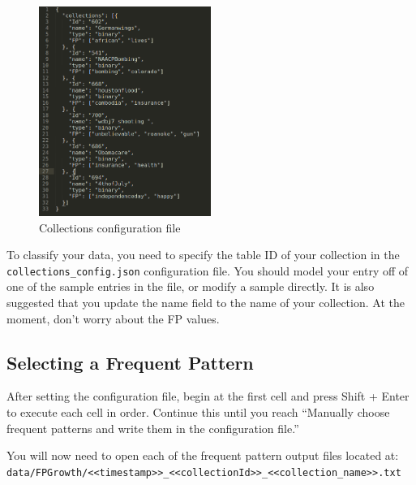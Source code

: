 \begin{figure}[th!]
	\centering
	\includegraphics[width=0.5\textwidth]{figures/collection_config}
    \caption{Collections configuration file}\label{fig:collection_config}
\end{figure}


To classify your data, you need to specify the table ID of your collection in the \texttt{collections\_config.json} configuration file. You should model your entry off of one of the sample entries in the file, or modify a sample directly. It is also suggested that you update the name field to the name of your collection. At the moment, don't worry about the FP values.

\subsection{Selecting a Frequent Pattern}

After setting the configuration file, begin at the first cell and press Shift + Enter to execute each cell in order. Continue this until you reach ``Manually choose frequent patterns and write them in the configuration file.''

You will now need to open each of the frequent pattern output files located at:\\
\texttt{data/FPGrowth/<<timestamp>>\_<<collectionId>>\_<<collection\_name>>.txt}

